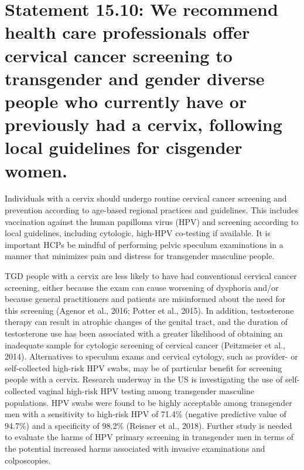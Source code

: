 \documentclass[
]{book}
\begin{document}
\hypertarget{statement-15.10-we-recommend-health-care-professionals-offer-cervical-cancer-screening-to-transgender-and-gender-diverse-people-who-currently-have-or-previously-had-a-cervix-following-local-guidelines-for-cisgender-women.}{%
\section*{Statement 15.10: We recommend health care professionals offer cervical cancer screening to transgender and gender diverse people who currently have or previously had a cervix, following local guidelines for cisgender women.}\label{statement-15.10-we-recommend-health-care-professionals-offer-cervical-cancer-screening-to-transgender-and-gender-diverse-people-who-currently-have-or-previously-had-a-cervix-following-local-guidelines-for-cisgender-women.}}

Individuals with a cervix should undergo routine cervical cancer screening and prevention
according to age-based regional practices and
guidelines. This includes vaccination against the
human papilloma virus (HPV) and screening
according to local guidelines, including cytologic,
high-HPV co-testing if available. It is important
HCPs be mindful of performing pelvic speculum
examinations in a manner that minimizes pain
and distress for transgender masculine people.

TGD people with a cervix are less likely to
have had conventional cervical cancer screening,
either because the exam can cause worsening of
dysphoria and/or because general practitioners
and patients are misinformed about the need for
this screening (Agenor et al., 2016; Potter et al.,
2015). In addition, testosterone therapy can result
in atrophic changes of the genital tract, and the
duration of testosterone use has been associated
with a greater likelihood of obtaining an inadequate sample for cytologic screening of cervical
cancer (Peitzmeier et al., 2014). Alternatives to
speculum exams and cervical cytology, such as
provider- or self-collected high-risk HPV swabs,
may be of particular benefit for screening people
with a cervix. Research underway in the US is
investigating the use of self-collected vaginal
high-risk HPV testing among transgender masculine populations. HPV swabs were found to be
highly acceptable among transgender men with
a sensitivity to high-risk HPV of 71.4\% (negative
predictive value of 94.7\%) and a specificity of
98.2\% (Reisner et al., 2018). Further study is
needed to evaluate the harms of HPV primary
screening in transgender men in terms of the
potential increased harms associated with invasive
examinations and colposcopies.
\end{document}
